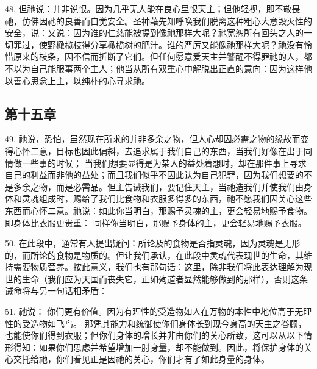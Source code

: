 48. 但祂说：并非说恨。因为几乎无人能在良心里恨天主；但他轻视，即不敬畏祂，仿佛因祂的良善而自觉安全。圣神藉先知呼唤我们脱离这种粗心大意毁灭性的安全，说：又说：因为谁的仁慈能被提到像祂那样大呢？祂宽恕所有回头之人的一切罪过，使野橄榄枝得分享橄榄树的肥汁。谁的严厉又能像祂那样大呢？祂没有怜惜原来的枝条，因不信而折断了它们。但任何愿意爱天主并警醒不得罪祂的人，都不以为自己能服事两个主人；他当从所有双重心中解脱出正直的意向：因为这样他以善心思念上主，以纯朴的心寻求祂。\par


\subsection{第十五章}

49. 祂说，恐怕，虽然现在所求的并非多余之物，但人心却因必需之物的缘故而变得心怀二意，目标也因此偏斜，去追求属于我们自己的东西，当我们好像在出于同情做一些事的时候； 当我们想要显得是为某人的益处着想时，却在那件事上寻求自己的利益而非他的益处；而且我们似乎不因此认为自己犯罪，因为我们想要的不是多余之物，而是必需品。但主告诫我们，要记住天主，当祂造我们并使我们由身体和灵魂组成时，赐给了我们比食物和衣服多得多的东西，祂不愿我们因关心这些东西而心怀二意。祂说：如此你当明白，那赐予灵魂的主，更会轻易地赐予食物。即身体比衣服更贵重： 同样你当明白，那赐予身体的主，更会轻易地赐予衣服。\par

50. 在此段中，通常有人提出疑问：所论及的食物是否指灵魂，因为灵魂是无形的，而所论的食物是物质的。但让我们承认，在此段中灵魂代表现世的生命，其维持需要物质营养。按此意义，我们也有那句话：这里，除非我们将此表达理解为现世的生命（我们应为天国而丧失它，正如殉道者显然能够做到的那样），否则这条诫命将与另一句话相矛盾：\par

51. 祂说：  你们更有价值。因为有理性的受造物如人在万物的本性中地位高于无理性的受造物如飞鸟。 那凭其能力和统御使你们身体长到现今身高的天主之眷顾，也能使你们得到衣服；但你们身体的增长并非由你们的关心所致，这可以从以下情形得知：如果你们思虑并希望增加一肘身量，却不能做到。因此，将保护身体的关心交托给祂，你们看见正是因祂的关心，你们才有了如此身量的身体。\par

